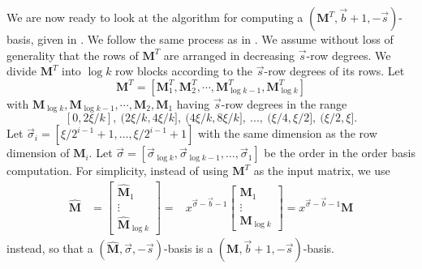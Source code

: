 We are now ready to look at the algorithm for computing a $\left(\mathbf{M}^{T},\vec{b}+1,-\vec{s}\right)$-basis,
given in .  We follow the same
process as in . We assume without
loss of generality that the rows of $\mathbf{M}^{T}$ are arranged
in decreasing $\vec{s}$-row degrees. We divide $\mathbf{M}^{T}$
into $\log k$ row blocks according to the $\vec{s}$-row degrees
of its rows. Let 
\[
\mathbf{M}^{T}=\left[\mathbf{M}_{1}^{T},\mathbf{M}_{2}^{T},\cdots,\mathbf{M}_{\log k-1}^{T},\mathbf{M}_{\log k}^{T}\right]
\]
 with $\mathbf{M}_{\log k},\mathbf{M}_{\log k-1},\cdots,\mathbf{M}_{2},\mathbf{M}_{1}$
having $\vec{s}$-row degrees in the range 
\[
\left[0,2\xi/k\right],\ (2\xi/k,4\xi/k],\ (4\xi/k,8\xi/k],\ ...,\ (\xi/4,\xi/2],\ (\xi/2,\xi].
\]
 Let $\vec{\sigma}_{i}=\left[\xi/2^{i-1}+1,\dots,\xi/2^{i-1}+1\right]$
with the same dimension as the row dimension of $\mathbf{M}_{i}$.
Let $\vec{\sigma}=\left[\vec{\sigma}_{\log k},\vec{\sigma}_{\log k-1},\dots,\vec{\sigma}_{1}\right]$
be the order in the order basis computation. For simplicity, instead
of using $\mathbf{M}^{T}$ as the input matrix, we use 
\begin{eqnarray*}
\hat{\mathbf{M}} & =\begin{bmatrix}\hat{\mathbf{M}}_{1}\\
\vdots\\
\hat{\mathbf{M}}_{\log k}
\end{bmatrix}= & x^{\vec{\sigma}-\vec{b}-1}\begin{bmatrix}\mathbf{M}_{1}\\
\vdots\\
\mathbf{M}_{\log k}
\end{bmatrix}=x^{\vec{\sigma}-\vec{b}-1}\mathbf{M}
\end{eqnarray*}
 instead, so that a $\left(\hat{\mathbf{M}},\vec{\sigma},-\vec{s}\right)$-basis
is a $\left(\mathbf{M},\vec{b}+1,-\vec{s}\right)$-basis.



